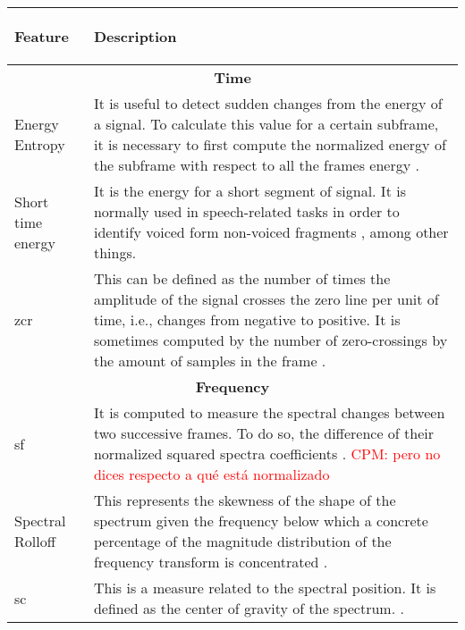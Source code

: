 	\begin{table}[h!]
		\begin{center}
			\centering
			\begin{tabular}{|| m{9em} | m{24em} ||}
				\hline
				\begin{center}\textbf{Feature}\end{center}& \begin{center}\textbf{Description}\end{center} \\
				\hline\hline
				\multicolumn{2}{||c||}{\textbf{Time}} \\
				\hline
				Energy Entropy & It is useful to detect sudden changes from the energy of a signal. To calculate this value for a certain subframe, it is necessary to first compute the normalized energy of the subframe with respect to all the frames energy \cite{Giannakopoulos2006}. \\
				\hline
				Short time energy & It is the energy for a short segment of signal. It is normally used in speech-related tasks in order to identify voiced form non-voiced fragments \cite{Garcia-Gomez2016}, among other things. \\
				\hline
				\acrfull{zcr} & This can be defined as the number of times the amplitude of the signal crosses the zero line per unit of time, i.e., changes from negative to positive. It is sometimes computed by the number of zero-crossings by the amount of samples in the frame \cite{Giannakopoulos2006}. \\
				\hline
				\multicolumn{2}{||c||}{\textbf{Frequency}} \\
				\hline
				\acrfull{sf} & It is computed to measure the spectral changes between two successive frames. To do so, the difference of their normalized squared spectra coefficients  \cite{Giannakopoulos2006}. \textcolor{red}{CPM: pero no dices respecto a qué está normalizado} \\
				\hline
				Spectral Rolloff & This represents the skewness of the shape of the spectrum given the frequency below which a concrete percentage of the magnitude distribution of the frequency transform is concentrated \cite{Garcia-Gomez2016}. \\
				\hline
				\acrfull{sc} & This is a measure related to the spectral position. It is defined as the center of gravity of the spectrum. %
				\cite{Giannakopoulos2006}. \\
				\hline

\end{tabular}
\end{center}
\end{table}
